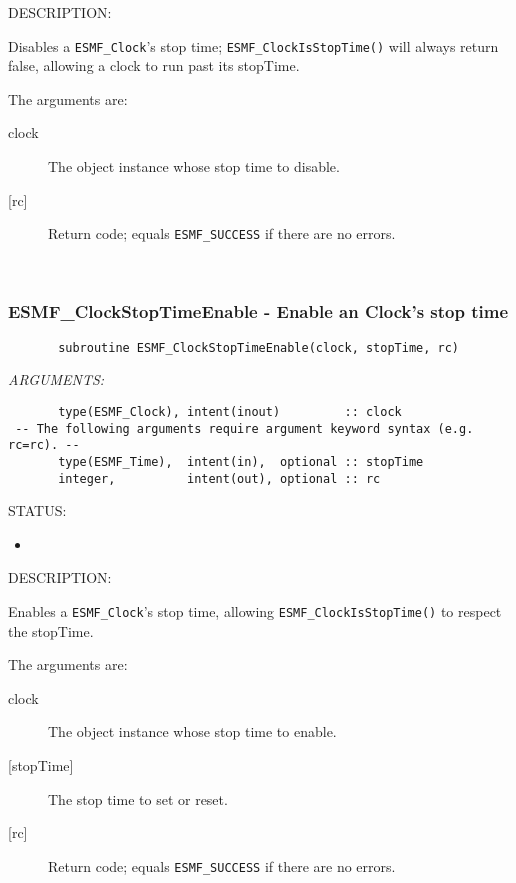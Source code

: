 {\sf DESCRIPTION:\\ }


       Disables a {\tt ESMF\_Clock}'s stop time; {\tt ESMF\_ClockIsStopTime()}
       will always return false, allowing a clock to run past its stopTime.
  
       The arguments are:
       \begin{description}
       \item[clock]
            The object instance whose stop time to disable.
       \item[{[rc]}]
            Return code; equals {\tt ESMF\_SUCCESS} if there are no errors.
       \end{description} 
 
\mbox{}\hrulefill\ 
 
\subsubsection [ESMF\_ClockStopTimeEnable] {ESMF\_ClockStopTimeEnable - Enable an Clock's stop time}


 
\begin{verbatim}       subroutine ESMF_ClockStopTimeEnable(clock, stopTime, rc)
 \end{verbatim}{\em ARGUMENTS:}
\begin{verbatim}       type(ESMF_Clock), intent(inout)         :: clock
 -- The following arguments require argument keyword syntax (e.g. rc=rc). --
       type(ESMF_Time),  intent(in),  optional :: stopTime
       integer,          intent(out), optional :: rc
 \end{verbatim}
{\sf STATUS:}
   \begin{itemize}
   \item{}
   \end{itemize}
  
{\sf DESCRIPTION:\\ }


       Enables a {\tt ESMF\_Clock}'s stop time, allowing
       {\tt ESMF\_ClockIsStopTime()} to respect the stopTime.
  
       The arguments are:
       \begin{description}
       \item[clock]
            The object instance whose stop time to enable.
       \item[{[stopTime]}]
            The stop time to set or reset.
       \item[{[rc]}]
            Return code; equals {\tt ESMF\_SUCCESS} if there are no errors.
       \end{description} 
 
